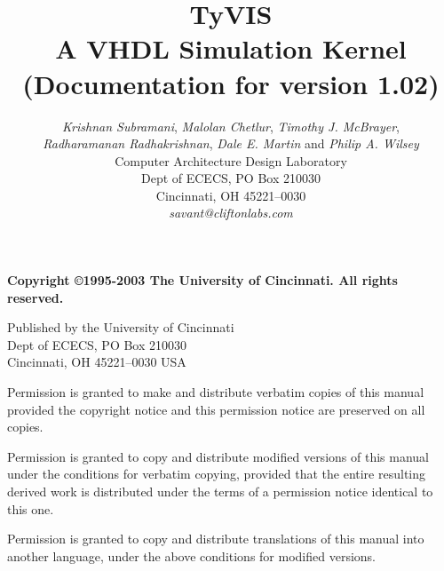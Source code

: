 \documentclass[11pt]{article}
\newcommand{\version}{1.02}
\begin{document}
\title{
\textbf{TyVIS}\\
A VHDL Simulation Kernel\\
(Documentation for version \version)}

\author{
\emph{Krishnan Subramani}, \emph{Malolan Chetlur}, \emph{Timothy
J. McBrayer},\\ \emph{Radharamanan Radhakrishnan}, \emph{Dale E. Martin}
and \emph{Philip A.  Wilsey} \\
Computer Architecture Design Laboratory \\
Dept of ECECS, PO Box 210030 \\
Cincinnati, OH  45221--0030 \\
\textit{savant@cliftonlabs.com}
}

\date{}

\maketitle

\vspace*{1.5in}

\begin{center}
\noindent
\textbf{Copyright \copyright 1995-2003 The University of Cincinnati.  All
rights reserved.}  

\bigskip
\noindent
Published by the University of Cincinnati \\
Dept of ECECS, PO Box 210030 \\
Cincinnati, OH  45221--0030 USA 
\end{center}

\bigskip

\noindent
Permission is granted to make and distribute verbatim copies of
this manual provided the copyright notice and this permission notice
are preserved on all copies.

\medskip
\noindent
Permission is granted to copy and distribute modified versions of this
manual under the conditions for verbatim copying, provided that the entire
resulting derived work is distributed under the terms of a permission
notice identical to this one.

\medskip
\noindent
Permission is granted to copy and distribute translations of this manual
into another language, under the above conditions for modified versions.

\newpage
\setcounter{page}{1}

\tableofcontents
\newpage
\end{document}
